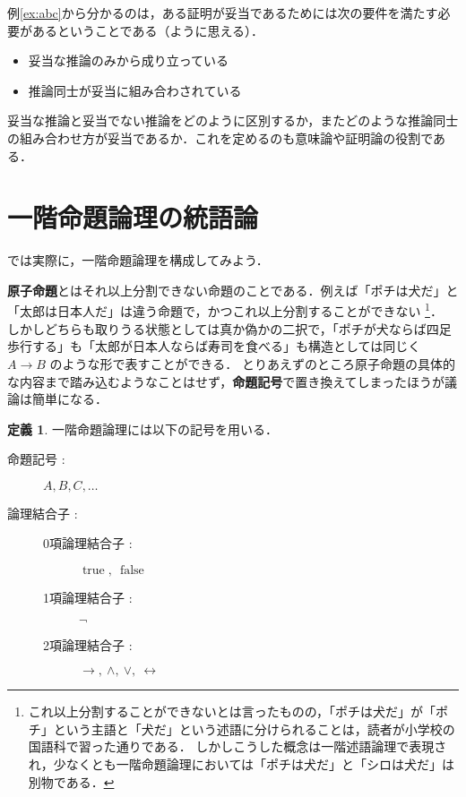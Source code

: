 \documentclass[uplatex,a4paper,dvipdfmx]{jsarticle}
\DeclareMathOperator{\true}{\mathrm{true}}
\DeclareMathOperator{\false}{\mathrm{false}}
\theoremstyle{definition}
\newtheorem{dfn}{定義}
\begin{document}
        例\ref{ex:abc}から分かるのは，ある証明が妥当であるためには次の要件を満たす必要があるということである（ように思える）．

        \begin{itemize}
            \item 妥当な推論のみから成り立っている
            \item 推論同士が妥当に組み合わされている
        \end{itemize}

        妥当な推論と妥当でない推論をどのように区別するか，またどのような推論同士の組み合わせ方が妥当であるか．これを定めるのも意味論や証明論の役割である．


    \section{一階命題論理の統語論}
        では実際に，一階命題論理を構成してみよう．

        \textbf{原子命題}とはそれ以上分割できない命題のことである．例えば「ポチは犬だ」と「太郎は日本人だ」は違う命題で，かつこれ以上分割することができない
        \footnote{これ以上分割することができないとは言ったものの，「ポチは犬だ」が「ポチ」という主語と「犬だ」という述語に分けられることは，読者が小学校の国語科で習った通りである．
        しかしこうした概念は一階述語論理で表現され，少なくとも一階命題論理においては「ポチは犬だ」と「シロは犬だ」は別物である．}．
        しかしどちらも取りうる状態としては真か偽かの二択で，「ポチが犬ならば四足歩行する」も「太郎が日本人ならば寿司を食べる」も構造としては同じく $A \to B$ のような形で表すことができる．
        とりあえずのところ原子命題の具体的な内容まで踏み込むようなことはせず，\textbf{命題記号}で置き換えてしまったほうが議論は簡単になる．

        \begin{dfn}
            一階命題論理には以下の記号を用いる．
            \begin{description}
                \item[命題記号 : ] $A, B, C,\ldots$
                \item[論理結合子 : ] \leavevmode
                    \begin{description}
                        \item[0項論理結合子 : ] $\true,\ \false$
                        \item[1項論理結合子 : ] $\lnot$
                        \item[2項論理結合子 : ] $\to,\ \land,\ \lor,\ \leftrightarrow$
                    \end{description}
            \end{description}
        \end{dfn}
\end{document}
